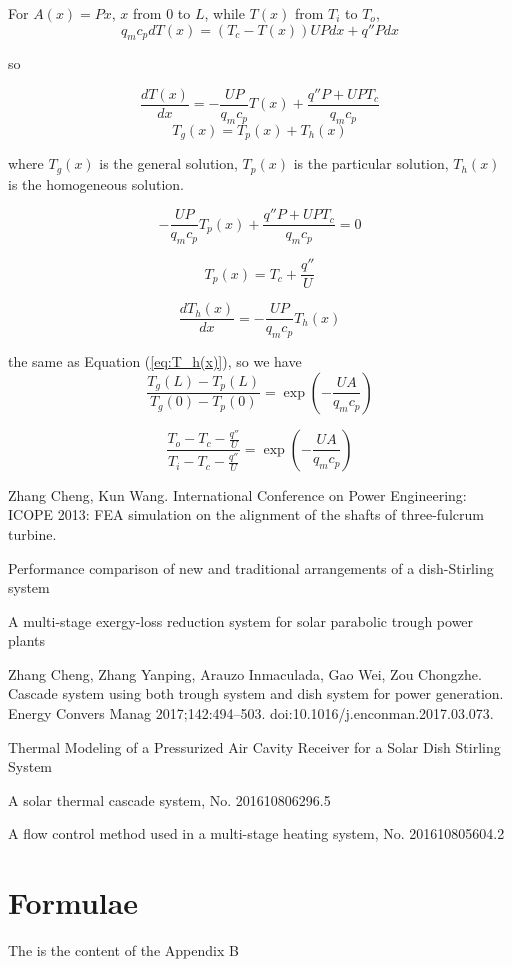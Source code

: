 For $A(x)=Px$, $x$ from $0$ to $L$, while $T(x)$ from $T_{i}$ to $T_{o}$,
\begin{equation}
q_{m}c_{p}dT(x)=(T_{c}-T(x))UPdx+q''Pdx
\end{equation}

so

\begin{equation}
\frac{dT(x)}{dx}=-\frac{UP}{q_{m}c_{p}}T(x)+\frac{q''P+UPT_{c}}{q_{m}c_{p}}
\end{equation}
\begin{equation}
T_{g}(x)=T_{p}(x)+T_{h}(x)
\end{equation}

where $T_{g}(x)$ is the general solution, $T_{p}(x)$ is the particular
solution, $T_{h}(x)$ is the homogeneous solution.

\begin{equation}
-\frac{UP}{q_{m}c_{p}}T_{p}(x)+\frac{q''P+UPT_{c}}{q_{m}c_{p}}=0
\end{equation}

\begin{equation}
T_{p}(x)=T_{c}+\frac{q''}{U}
\end{equation}

\begin{equation}
\frac{dT_{h}(x)}{dx}=-\frac{UP}{q_{m}c_{p}}T_{h}(x)
\end{equation}

the same as Equation (\ref{eq:T_h(x)}), so we have
\begin{equation}
\frac{T_{g}(L)-T_{p}(L)}{T_{g}(0)-T_{p}(0)}=\exp(-\frac{UA}{q_{m}c_{p}})
\end{equation}

\begin{equation}
\frac{T_{o}-T_{c}-\frac{q''}{U}}{T_{i}-T_{c}-\frac{q''}{U}}=\exp(-\frac{UA}{q_{m}c_{p}})
\end{equation}


\begin{publications}
  \item Zhang Cheng, Kun Wang. International Conference on Power Engineering: ICOPE 2013: FEA simulation on the alignment of the shafts of three-fulcrum turbine.
  \item Performance comparison of new and traditional arrangements of a dish-Stirling system
	\item A multi-stage exergy-loss reduction system for solar parabolic trough power plants
	\item Zhang Cheng, Zhang Yanping, Arauzo Inmaculada, Gao Wei, Zou Chongzhe. Cascade system using both trough system and dish system for power generation. Energy Convers Manag 2017;142:494–503. doi:10.1016/j.enconman.2017.03.073.
  \item Thermal Modeling of a Pressurized Air Cavity Receiver for a Solar Dish Stirling System
  \item A solar thermal cascade system, No. 201610806296.5
  \item A flow control method used in a multi-stage heating system, No. 201610805604.2
\end{publications}

\chapter{Formulae}\label{appendix:2}
  The is the content of the Appendix B